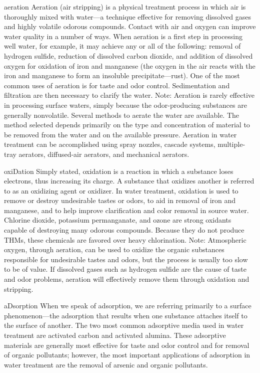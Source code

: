 \documentclass{article}
\begin{document}
aeration Aeration (air stripping) is a physical treatment process in
which air is thoroughly mixed with water---a technique effective for
removing dissolved gases and highly volatile odorous compounds. Contact
with air and oxygen can improve water quality in a number of ways. When
aeration is a first step in processing well water, for example, it may
achieve any or all of the following: removal of hydrogen sulfide,
reduction of dissolved carbon dioxide, and addition of dissolved oxygen
for oxidation of iron and manganese (the oxygen in the air reacts with
the iron and manganese to form an insoluble precipitate---rust). One of
the most common uses of aeration is for taste and odor control.
Sedimentation and filtration are then necessary to clarify the water.
Note: Aeration is rarely effective in processing surface waters, simply
because the odor-producing substances are generally nonvolatile. Several
methods to aerate the water are available. The method selected depends
primarily on the type and concentration of material to be removed from
the water and on the available pressure. Aeration in water treatment can
be accomplished using spray nozzles, cascade systems, multiple-tray
aerators, diffused-air aerators, and mechanical aerators.

oxiDation Simply stated, oxidation is a reaction in which a substance
loses electrons, thus increasing its charge. A substance that oxidizes
another is referred to as an oxidizing agent or oxidizer. In water
treatment, oxidation is used to remove or destroy undesirable tastes or
odors, to aid in removal of iron and manganese, and to help improve
clarification and color removal in source water. Chlorine dioxide,
potassium permanganate, and ozone are strong oxidants capable of
destroying many odorous compounds. Because they do not produce THMs,
these chemicals are favored over heavy chlorination. Note: Atmospheric
oxygen, through aeration, can be used to oxidize the organic substances
responsible for undesirable tastes and odors, but the process is usually
too slow to be of value. If dissolved gases such as hydrogen sulfide are
the cause of taste and odor problems, aeration will effectively remove
them through oxidation and stripping.

aDsorption When we speak of adsorption, we are referring primarily to a
surface phenomenon---the adsorption that results when one substance
attaches itself to the surface of another. The two most common
adsorptive media used in water treatment are activated carbon and
activated alumina. These adsorptive materials are generally most
effective for taste and odor control and for removal of organic
pollutants; however, the most important applications of adsorption in
water treatment are the removal of arsenic and organic pollutants.
\end{document}
